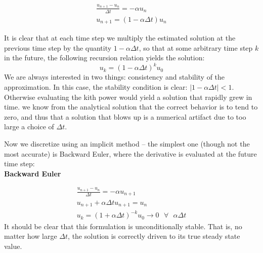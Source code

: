 \documentclass[11pt]{article}
\begin{document}
\begin{eqnarray}
\frac{u_{n+1} - u_n}{\Delta t} = -\alpha u_n \nonumber \\
u_{n+1} = (1-\alpha \Delta t)u_n
\end{eqnarray}

It is clear that at each time step we multiply the estimated solution at the previous time step by the quantity $1-\alpha \Delta t$, so that at some arbitrary time step $k$ in the future, the following recursion relation yields the solution:
\begin{equation}
u_k = (1 -\alpha \Delta t)^k u_0
\end{equation}
We are always interested in two things: consistency and stability of the approximation. In this case, the stability condition is clear: $ |1-\alpha \Delta t | < 1 $. Otherwise evaluating the kith power would yield a solution that rapidly grew in time. we know from the analytical solution that the correct behavior is to tend to zero, and thus that a solution that blows up is a numerical artifact due to too large a choice of $\Delta t$. 

Now we discretize using an implicit method -- the simplest one (though not the most accurate) is Backward Euler, where the derivative is evaluated at the future time step:
\\{\bf Backward Euler}

\begin{eqnarray}
\frac{u_{n+1} - u_n}{\Delta t} = - \alpha u_{n+1}  \nonumber \\
u_{n+1} + \alpha \Delta t u_{n+1} = u_n \nonumber \\
u_k = (1 + \alpha \Delta t)^{-k} u_0 \rightarrow 0 \text{   $\forall$   } \alpha \Delta t
\end{eqnarray}
It should be clear that this formulation is unconditionally stable. That is, no matter how large $\Delta t$, the solution is correctly driven to its true steady state value.
\end{document}
